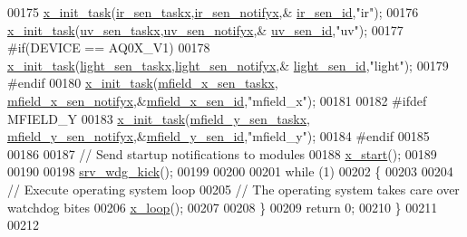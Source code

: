\begin{DoxyCode}
00175     \hyperlink{a00036_a1e79db5ed3ab326586129eb4d7b63d46}{x\_init\_task}(\hyperlink{a00017_a24529100c87dfc257e9b56f7f0bcfa78}{ir\_sen\_taskx},\hyperlink{a00017_a36c6c2cdf9aa5844371e742330789dad}{ir\_sen\_notifyx},&
      \hyperlink{a00017_a624782f67b3870f0dde83528770ef5fc}{ir\_sen\_id},\textcolor{stringliteral}{"ir"});
00176     \hyperlink{a00036_a1e79db5ed3ab326586129eb4d7b63d46}{x\_init\_task}(\hyperlink{a00020_ab4e931568892f0b46a2571d3c480f5c8}{uv\_sen\_taskx},\hyperlink{a00020_ae2617634df4d3055161f7fb1f148f6da}{uv\_sen\_notifyx},&
      \hyperlink{a00020_afd789f3f9ea182d28d4f16db0d8d5652}{uv\_sen\_id},\textcolor{stringliteral}{"uv"});
00177 \textcolor{preprocessor}{    #if(DEVICE == AQ0X\_V1)}
00178     \hyperlink{a00036_a1e79db5ed3ab326586129eb4d7b63d46}{x\_init\_task}(\hyperlink{a00018_ae9aa2f8b8e90a92755efbcd161c67bc0}{light\_sen\_taskx},\hyperlink{a00018_a317b03892739257278fd51ab8003962d}{light\_sen\_notifyx},&
      \hyperlink{a00018_a757e7771170ace1d9f8519bd318ec64a}{light\_sen\_id},\textcolor{stringliteral}{"light"});
00179 \textcolor{preprocessor}{    #endif}
00180     \hyperlink{a00036_a1e79db5ed3ab326586129eb4d7b63d46}{x\_init\_task}(\hyperlink{a00019_a72e9235043dc4a8469143a6eb48bf117}{mfield\_x\_sen\_taskx},
      \hyperlink{a00019_ac28a2b5f3fa92c0593446e15a63a501c}{mfield\_x\_sen\_notifyx},&\hyperlink{a00019_a19a33e680bf19d1aed76750132ed8b64}{mfield\_x\_sen\_id},\textcolor{stringliteral}{"mfield\_x"});
00181      
00182 \textcolor{preprocessor}{#ifdef MFIELD\_Y}
00183     \hyperlink{a00036_a1e79db5ed3ab326586129eb4d7b63d46}{x\_init\_task}(\hyperlink{a00019_adfb4e8d328a4cd1c7639082bef5841a9}{mfield\_y\_sen\_taskx},
      \hyperlink{a00019_a80b82366f7d22e925f279d20328f05c8}{mfield\_y\_sen\_notifyx},&\hyperlink{a00019_a99c4ad3cf8b9ce2b67351d6edf48f937}{mfield\_y\_sen\_id},\textcolor{stringliteral}{"mfield\_y"});
00184 \textcolor{preprocessor}{#endif}
00185    
00186    
00187     \textcolor{comment}{// Send startup notifications to modules}
00188     \hyperlink{a00036_aea907663ecaf77bacfb9f0bfdc11f900}{x\_start}();        
00189 
00190      
00198     \hyperlink{a00067_a710d148845397582739d170341f3d3d9}{srv\_wdg\_kick}();
00199 
00200 
00201     \textcolor{keywordflow}{while} (1)             
00202     \{
00203          
00204         \textcolor{comment}{// Execute operating system loop}
00205         \textcolor{comment}{// The operating system takes care over watchdog bites}
00206         \hyperlink{a00036_a4bb7a012be733e061c913e7b98df642b}{x\_loop}();
00207 
00208     \}
00209     \textcolor{keywordflow}{return} 0;             
00210 \}
00211 
00212 
\end{DoxyCode}
